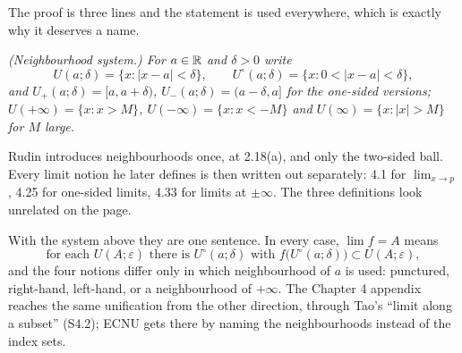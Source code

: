 \noindent
The proof is three lines and the statement is used everywhere, which is
exactly why it deserves a name.

\emph{(Neighbourhood system.) For $a \in \mathbb{R}$ and $\delta>0$ write}
\[ U(a;\delta) = \{x : |x-a|<\delta\}, \qquad
   U^{\circ}(a;\delta) = \{x : 0<|x-a|<\delta\}, \]
\emph{and $U_{+}(a;\delta) = [a, a+\delta)$,
$U_{-}(a;\delta) = (a-\delta, a]$ for the one-sided versions;
$U(+\infty) = \{x : x>M\}$, $U(-\infty) = \{x : x<-M\}$ and
$U(\infty) = \{x : |x|>M\}$ for $M$ large.}

\begin{deeper}
Rudin introduces neighbourhoods once, at 2.18(a), and only the two-sided
ball. Every limit notion he later defines is then written out separately:
4.1 for $\lim_{x\to p}$, 4.25 for one-sided limits, 4.33 for limits at
$\pm\infty$. The three definitions look unrelated on the page.

With the system above they are one sentence. In every case,
$\lim f = A$ means
\[ \text{for each } U(A;\varepsilon) \text{ there is }
   U^{\circ}(a;\delta) \text{ with } f\bigl(U^{\circ}(a;\delta)\bigr)
   \subset U(A;\varepsilon), \]
and the four notions differ only in which neighbourhood of $a$ is used:
punctured, right-hand, left-hand, or a neighbourhood of $+\infty$. The
Chapter 4 appendix reaches the same unification from the other direction,
through Tao's ``limit along a subset'' (S4.2); ECNU gets there by naming the
neighbourhoods instead of the index sets.
\end{deeper}


